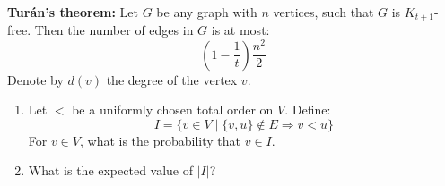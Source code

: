 \documentclass[a4paper,11pt]{exam}
\renewcommand{\binom}{\mbinom}
\begin{document}
\begin{questions}
%	
%		
%		
%		


{\bf Turán's theorem:} Let $G$ be any graph with $ n $ vertices, such that $G$ is $ K_{t+1}$-free. Then the number of edges in $G$ is at most:
\[
\left( 1- \frac{1}{t}\right)\frac{n^2}{2}
\] 
Denote by $d(v)$ the degree of the vertex $v$.
\begin{enumerate}
	\item Let $<$ be a uniformly chosen total order on $V$. Define:
	\[
	I=\{v\in V\mid \{v,u\}\notin E \Rightarrow v<u \}
	\]
	For $v\in V$, what is the probability that $v\in I$.
	\begin{solution}
		
	\end{solution}
	\item What is the expected value of $|I|$?
	

\end{enumerate}
\end{questions}
\end{document}
